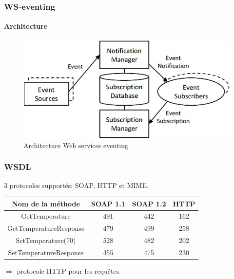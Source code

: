 \begin{frame}
 \frametitle{WS-eventing}
 \framesubtitle{Architecture}
 \begin{figure}
  \centering
  \includegraphics[scale=0.43]{figures/eventing.jpg}
  \caption{Architecture Web services eventing}
 \end{figure}
\end{frame}
\begin{frame}
 \frametitle{WSDL}
 3 protocoles supportés: SOAP, HTTP et MIME.\\
 \vspace{3mm}
 \begin{center}
 \begin{tabular}{|c|c|c|c|}
 \hline
 Nom de la méthode & SOAP 1.1 & SOAP 1.2 & HTTP\\
 \hline
 GetTemperature & 491 & 442 & 162\\
 GetTemperatureResponse & 479 & 499 & 258\\
 SetTemperature(70) & 528 & 482 & 202\\
 SetTemperatureResponse & 455 & 475 & 230\\
 \hline
 \end{tabular}
 \end{center}
 $\Rightarrow$ protocole HTTP pour les requêtes.
\end{frame}
